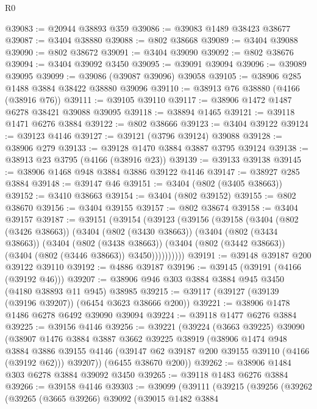 \begin{lexlean}{R0}
\begin{coremodule}
@39083 := @20944 @38893 @359
@39086 := @39083 @1489 @38423 @38677
@39087 := @3404 @38880
@39088 := @802 @38668
@39089 := @3404 @39088
@39090 := @802 @38672
@39091 := @3404 @39090
@39092 := @802 @38676
@39094 := @3404 @39092 @3450
@39095 := @39091 @39094
@39096 := @39089 @39095
@39099 := @39086 (@39087 @39096) @39058
@39105 := @38906 @285 @1488 @3884 @38422 @38880 @39096
@39110 := @38913 @76 @38880 (@4166 (@38916 @76))
@39111 := @39105 @39110
@39117 := @38906 @1472 @1487 @6278 @38421 @39088 @39095
@39118 := @38894 @1465
@39121 := @39118 @1471 @6276 @3884
@39122 := @802 @38666
@39123 := @3404 @39122
@39124 := @39123 @4146
@39127 := @39121 (@3796 @39124) @39088
@39128 := @38906 @279
@39133 := @39128 @1470 @3884 @3887 @3795 @39124
@39138 := @38913 @23 @3795 (@4166 (@38916 @23))
@39139 := @39133 @39138
@39145 := @38906 @1468 @948 @3884 @3886 @39122 @4146
@39147 := @38927 @285 @3884
@39148 := @39147 @46
@39151 := @3404 (@802 (@3405 @38663))
@39152 := @3410 @38663
@39154 := @3404 (@802 @39152)
@39155 := @802 @38670
@39156 := @3404 @39155
@39157 := @802 @38674
@39158 := @3404 @39157
@39187 := @39151
    (@39154
      (@39123
        (@39156
          (@39158
            (@3404
              (@802 (@3426 @38663))
              (@3404
                (@802 (@3430 @38663))
                (@3404
                  (@802 (@3434 @38663))
                  (@3404
                    (@802 (@3438 @38663))
                    (@3404 (@802 (@3442 @38663)) (@3404 (@802 (@3446 @38663)) @3450))))))))))
@39191 := @39148 @39187 @200 @39122 @39110
@39192 := @4886 @39187
@39196 := @39145 (@39191 (@4166 (@39192 @46)))
@39207 := @38906 @946 @303 @3884 @3884 @945 @3450 (@4180 @38893 @11 @945) @38985
@39215 := @39117 (@39127 (@39139 (@39196 @39207)) (@6454 @3623 @38666 @200))
@39221 := @38906 @1478 @1486 @6278 @6492 @39090 @39094
@39224 := @39118 @1477 @6276 @3884
@39225 := @39156 @4146
@39256 := @39221
    (@39224
      (@3663 @39225)
      @39090
      (@38907
        @1476
        @3884
        @3887
        @3662
        @39225
        @38919
        (@38906
          @1474
          @948
          @3884
          @3886
          @39155
          @4146
          (@39147 @62 @39187 @200 @39155 @39110 (@4166 (@39192 @62)))
          @39207))
      (@6455 @38670 @200))
@39262 := @38906 @1484 @303 @6278 @3884 @39092 @3450
@39265 := @39118 @1483 @6276 @3884
@39266 := @39158 @4146
@39303 := @39099
    (@39111
      (@39215
        (@39256
          (@39262
            (@39265
              (@3665 @39266)
              @39092
              (@39015
                @1482
                @3884

\end{coremodule}
\end{lexlean}

